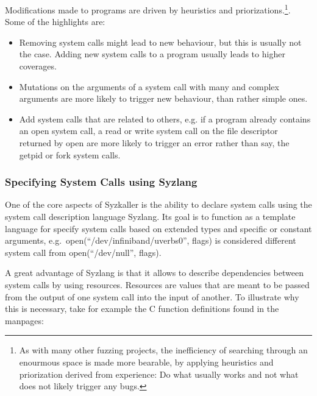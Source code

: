 Modifications made to programs are driven by heuristics and priorizations.\footnote{As with many other fuzzing projects, the inefficiency of searching through an enourmous space is made more bearable, by applying heuristics and priorization derived from experience: Do what usually works and not what does not likely trigger any bugs.}. Some of the highlights are\cite{vyukovSyzkallerAdventuresContinuous2020}:

\begin{itemize}
  \item Removing system calls might lead to new behaviour, but this is usually not the case. Adding new system calls to a program usually leads to higher coverages.
  \item Mutations on the arguments of a  system call with many and complex arguments are more likely to trigger new behaviour, than rather simple ones.
  \item Add system calls that are related to others, e.g. if a program already contains an open system call, a read or write system call on the file descriptor returned by open are more likely to trigger an error rather than say, the getpid or fork system calls.
\end{itemize}

\subsubsection{Specifying System Calls using Syzlang}


One of the core aspects of Syzkaller is the ability to declare system calls using
the system call description language Syzlang. Its goal is to function as a template
language for specify system calls based on extended types and specific or constant arguments,
e.g.\ open(``/dev/infiniband/uverbs0'', flags) is considered different system call from open(``/dev/null'', flags).

A great advantage of Syzlang is
that it allows to describe dependencies between system calls by using resources.
Resources are values that are meant to be passed from the output of one system call
into the input of another.
To illustrate why this is necessary, take for example the C function definitions found in the manpages:

